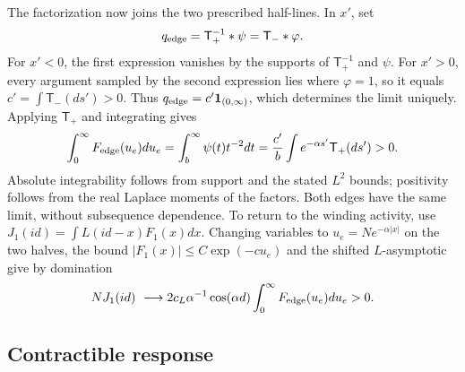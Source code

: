 The factorization now joins the two prescribed half-lines. In \(x'\), set
\[
       q_{\rm edge}=\mathsf T_+^{-1}*\psi=\mathsf T_-*\varphi.
\]
For \(x'<0\), the first expression vanishes by the supports of
\(\mathsf T_+^{-1}\) and \(\psi\). For \(x'>0\), every argument sampled
by the second expression lies where \(\varphi=1\), so it equals
\(c'=\int\mathsf T_-(ds')>0\). Thus
\(q_{\rm edge}=c'\mathbf1_{(0,\infty)}\), which determines the limit
uniquely. Applying \(\mathsf T_+\) and integrating gives
\[
 \int_0^\infty F_{\rm edge}(u_e)du_e=\int_b^\infty \psi(t)t^{-2}dt
       =\frac{c'}b\int e^{-\alpha s'}\mathsf T_+(ds')>0 .
\]
Absolute integrability follows from support and the stated \(L^2\)
bounds; positivity follows from the real Laplace moments of the factors.
Both edges have the same limit, without subsequence dependence. To return
to the winding activity, use \(J_1(id)=\int L(id-x)F_1(x)dx\).
Changing variables to \(u_e=N e^{-\alpha|x|}\) on the two halves,
the bound \(|F_1(x)|\le C\exp(-c u_e)\) and the shifted
\(L\)-asymptotic give by domination
\begin{equation}
           N J_1(id)\ \longrightarrow             2 c_L \alpha^{-1}\cos(\alpha d)\int_0^\infty F_{\rm edge}(u_e)du_e>0 .
                                                                             \label{c4:Press-3}
\end{equation}

\subsection{Contractible response}\label{c4:contractible-pressure}

